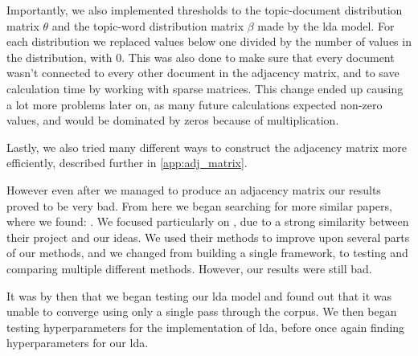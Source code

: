 Importantly, we also implemented thresholds to the topic-document distribution matrix $\theta$ and the topic-word distribution matrix $\beta$ made by the \gls{lda} model.
For each distribution we replaced values below one divided by the number of values in the distribution, with 0.
This was also done to make sure that every document wasn't connected to every other document in the adjacency matrix, and to save calculation time by working with sparse matrices.
This change ended up causing a lot more problems later on, as many future calculations expected non-zero values, and would be dominated by zeros because of multiplication.

Lastly, we also tried many different ways to construct the adjacency matrix more efficiently, described further in \autoref{app:adj_matrix}.

However even after we managed to produce an adjacency matrix our results proved to be very bad.
From here we began searching for more similar papers, where we found: .
We focused particularly on , due to a strong similarity between their project and our ideas.
We used their methods to improve upon several parts of our methods, and we changed from building a single framework, to testing and comparing multiple different methods. 
However, our results were still bad.

It was by then that we began testing our \gls{lda} model and found out that it was unable to converge using only a single pass through the corpus. 
We then began testing hyperparameters for the implementation of \gls{lda}, before once again finding hyperparameters for our \gls{lda}.
